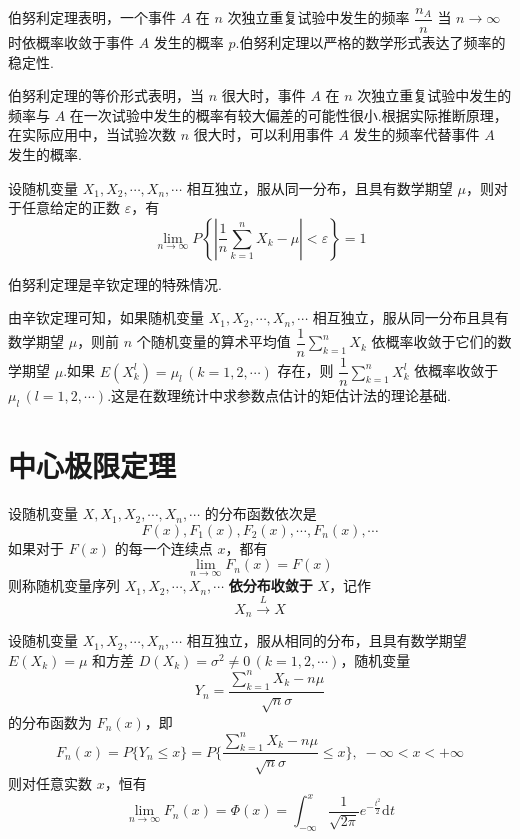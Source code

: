 伯努利定理表明，一个事件 $A$ 在 $n$ 次独立重复试验中发生的频率 $\dfrac{n_A}{n}$ 当 $n \to \infty$ 时依概率收敛于事件 $A$ 发生的概率 $p$.伯努利定理以严格的数学形式表达了频率的稳定性.

伯努利定理的等价形式表明，当 $n$ 很大时，事件 $A$ 在 $n$ 次独立重复试验中发生的频率与 $A$ 在一次试验中发生的概率有较大偏差的可能性很小.根据实际推断原理，在实际应用中，当试验次数 $n$ 很大时，可以利用事件 $A$ 发生的频率代替事件 $A$ 发生的概率.

\begin{theorem}[（辛钦定理）]
    设随机变量 $X_1,X_2,\cdots,X_n,\cdots$ 相互独立，服从同一分布，且具有数学期望 $\mu$，则对于任意给定的正数 $\varepsilon$，有
    $$
    \lim_{n \to \infty} P \left\{ \left| \dfrac{1}{n} \sum_{k=1}^n X_k - \mu \right| < \varepsilon \right\} = 1
    $$
\end{theorem}

伯努利定理是辛钦定理的特殊情况.

由辛钦定理可知，如果随机变量 $X_1,X_2,\cdots,X_n,\cdots$ 相互独立，服从同一分布且具有数学期望 $\mu$，则前 $n$ 个随机变量的算术平均值 $\dfrac{1}{n} \displaystyle\sum_{k=1}^n X_k$ 依概率收敛于它们的数学期望 $\mu$.如果 $E(X_k^l) = \mu_l \, (k=1,2,\cdots)$ 存在，则 $\dfrac{1}{n} \displaystyle\sum_{k=1}^n X_k^l$ 依概率收敛于 $\mu_l \, (l=1,2,\cdots)$.这是在数理统计中求参数点估计的矩估计法的理论基础.

\section{中心极限定理}

\begin{definition} \label{def: 依分布收敛}
    设随机变量 $X,X_1,X_2,\cdots,X_n,\cdots$ 的分布函数依次是
    $$
    F(x),F_1(x),F_2(x),\cdots,F_n(x),\cdots
    $$
    如果对于 $F(x)$ 的每一个连续点 $x$，都有
    $$
    \lim_{n \to \infty} F_n(x) = F(x)
    $$
    则称随机变量序列 $X_1,X_2,\cdots,X_n,\cdots$ \textbf{依分布收敛于} $X$，记作
    $$
    X_n \overset{L}{\longrightarrow} X
    $$
\end{definition}

\begin{theorem}[（独立同分布的中心极限定理）] \label{theorem: i.i.d}
    设随机变量 $X_1,X_2,\cdots,X_n,\cdots$ 相互独立，服从相同的分布，且具有数学期望 $E(X_k) = \mu$ 和方差 $D(X_k) = \sigma^2 \not= 0 \, (k=1,2,\cdots)$，随机变量
    $$
    Y_n = \dfrac{\displaystyle\sum_{k=1}^n X_k - n \mu}{\sqrt{n} \sigma}
    $$
    的分布函数为 $F_n(x)$，即
    $$
    F_n(x) = P \{ Y_n \leqslant x \} = P \Bigg\{ \dfrac{\displaystyle\sum_{k=1}^n X_k - n \mu}{\sqrt{n} \sigma} \leqslant x \Bigg\}, \; -\infty < x < +\infty
    $$
    则对任意实数 $x$，恒有
    $$
    \lim_{n \to \infty} F_n(x) = \varPhi(x) = \int_{-\infty}^x \dfrac{1}{\sqrt{2\pi}} e^{-\frac{t^2}{2}} \text{d}t
    $$
\end{theorem}

